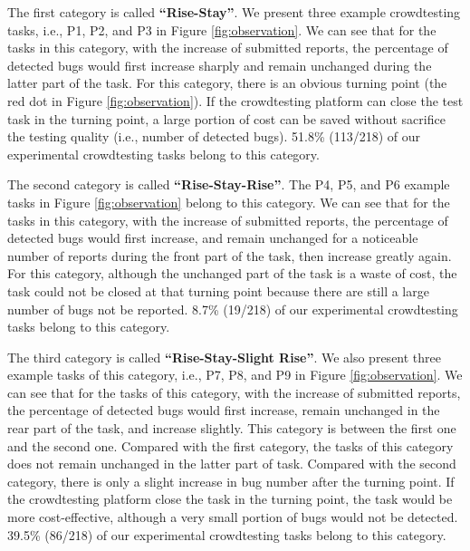\documentclass[sigconf,review, anonymous]{acmart}
\begin{document}


The first category is called \textbf{``Rise-Stay''}. We present three example crowdtesting tasks, i.e., P1, P2, and P3 in Figure \ref{fig:observation}.
We can see that for the tasks in this category, with the increase of submitted reports, the percentage of detected bugs would first increase sharply and remain unchanged during the latter part of the task.
For this category, there is an obvious turning point (the red dot in Figure \ref{fig:observation}).
If the crowdtesting platform can close the test task in the turning point, a large portion of cost can be saved without sacrifice the testing quality (i.e., number of detected bugs).
51.8\% (113/218) of our experimental crowdtesting tasks belong to this category.

The second category is called \textbf{``Rise-Stay-Rise''}. The P4, P5, and P6 example tasks in Figure \ref{fig:observation} belong to this category.
We can see that for the tasks in this category, with the increase of submitted reports, the percentage of detected bugs would first increase, and remain unchanged for a noticeable number of reports during the front part of the task, then increase greatly again.
For this category, although the unchanged part of the task is a waste of cost, the task could not be closed at that turning point because there are still a large number of bugs not be reported.
8.7\% (19/218) of our experimental crowdtesting tasks belong to this category.

The third category is called \textbf{``Rise-Stay-Slight Rise''}. We also present three example tasks of this category, i.e., P7, P8, and P9 in Figure \ref{fig:observation}.
We can see that for the tasks of this category, with the increase of submitted reports, the percentage of detected bugs would first increase, remain unchanged in the rear part of the task, and increase slightly.
This category is between the first one and the second one.
Compared with the first category, the tasks of this category does not remain unchanged in the latter part of task.
Compared with the second category, there is only a slight increase in bug number after the turning point.
If the crowdtesting platform close the task in the turning point, the task would be more cost-effective, although a very small portion of bugs would not be detected.
39.5\% (86/218) of our experimental crowdtesting tasks belong to this category.

\end{document}
